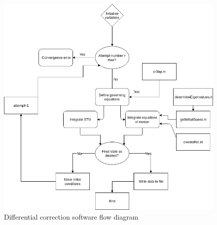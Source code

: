\begin{figure}
\centering
\includegraphics[height=.4\textheight]{figures/differentialCorrectorFlow}
\caption{Differential correction software flow diagram}
\label{f:differentialcorrectorflow}
\end{figure}